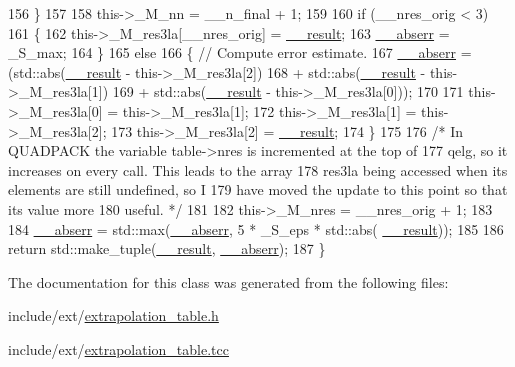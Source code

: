 \begin{DoxyCode}
156         \}
157 
158       this->\_M\_nn = \_\_n\_final + 1;
159 
160       \textcolor{keywordflow}{if} (\_\_nres\_orig < 3)
161         \{
162           this->\_M\_res3la[\_\_nres\_orig] = \hyperlink{namespace____gnu__cxx_a500ea9f53aeaecd8c2ae657503450578}{\_\_result};
163           \hyperlink{namespace____gnu__cxx_a72f736cff127f1574e91a301de9e074b}{\_\_abserr} = \_S\_max;
164         \}
165       \textcolor{keywordflow}{else}
166         \{ \textcolor{comment}{// Compute error estimate.}
167           \hyperlink{namespace____gnu__cxx_a72f736cff127f1574e91a301de9e074b}{\_\_abserr} = (std::abs(\hyperlink{namespace____gnu__cxx_a500ea9f53aeaecd8c2ae657503450578}{\_\_result} - this->\_M\_res3la[2])
168                     + std::abs(\hyperlink{namespace____gnu__cxx_a500ea9f53aeaecd8c2ae657503450578}{\_\_result} - this->\_M\_res3la[1])
169                     + std::abs(\hyperlink{namespace____gnu__cxx_a500ea9f53aeaecd8c2ae657503450578}{\_\_result} - this->\_M\_res3la[0]));
170 
171           this->\_M\_res3la[0] = this->\_M\_res3la[1];
172           this->\_M\_res3la[1] = this->\_M\_res3la[2];
173           this->\_M\_res3la[2] = \hyperlink{namespace____gnu__cxx_a500ea9f53aeaecd8c2ae657503450578}{\_\_result};
174         \}
175 
176       \textcolor{comment}{/* In QUADPACK the variable table->nres is incremented at the top of}
177 \textcolor{comment}{        qelg, so it increases on every call. This leads to the array}
178 \textcolor{comment}{        res3la being accessed when its elements are still undefined, so I}
179 \textcolor{comment}{        have moved the update to this point so that its value more}
180 \textcolor{comment}{        useful. */}
181 
182       this->\_M\_nres = \_\_nres\_orig + 1;
183 
184       \hyperlink{namespace____gnu__cxx_a72f736cff127f1574e91a301de9e074b}{\_\_abserr} = std::max(\hyperlink{namespace____gnu__cxx_a72f736cff127f1574e91a301de9e074b}{\_\_abserr}, 5 * \_S\_eps * std::abs(
      \hyperlink{namespace____gnu__cxx_a500ea9f53aeaecd8c2ae657503450578}{\_\_result}));
185 
186       \textcolor{keywordflow}{return} std::make\_tuple(\hyperlink{namespace____gnu__cxx_a500ea9f53aeaecd8c2ae657503450578}{\_\_result}, \hyperlink{namespace____gnu__cxx_a72f736cff127f1574e91a301de9e074b}{\_\_abserr});
187     \}
\end{DoxyCode}


The documentation for this class was generated from the following files\+:\begin{DoxyCompactItemize}
\item 
include/ext/\hyperlink{extrapolation__table_8h}{extrapolation\+\_\+table.\+h}\item 
include/ext/\hyperlink{extrapolation__table_8tcc}{extrapolation\+\_\+table.\+tcc}\end{DoxyCompactItemize}
